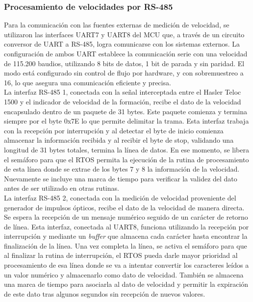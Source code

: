 \subsubsection{Procesamiento de velocidades por RS-485}

Para la comunicación con las fuentes externas de medición de velocidad, se utilizaron las interfaces UART7 y UART8 del MCU que, a través de un circuito conversor de UART a RS-485, logra comunicarse con los sistemas externos. La configuración de ambos UART establece la comunicación serie con una velocidad de 115.200 baudios, utilizando 8 bits de datos, 1 bit de parada y sin paridad. El modo está configurado sin control de flujo por hardware, y con sobremuestreo a 16, lo que asegura una comunicación eficiente y precisa. \\

La interfaz RS-485 1, conectada con la señal interceptada entre el Hasler Teloc 1500 y el indicador de velocidad de la formación, recibe el dato de la velocidad encapsulado dentro de un paquete de 31 bytes. Este paquete comienza y termina siempre por el byte 0x7E lo que permite delimitar la trama. Esta interfaz trabaja con la recepción por interrupción y al detectar el byte de inicio comienza almacenar la información recibida y al recibir el byte de stop, validando una longitud de 31 bytes totales, termina la línea de datos. En ese momento, se libera el semáforo para que el RTOS permita la ejecución de la rutina de procesamiento de esta línea donde se extrae de los bytes 7 y 8 la información de la velocidad. Nuevamente se incluye una marca de tiempo para verificar la validez del dato antes de ser utilizado en otras rutinas. \\

La interfaz RS-485 2, conectada con la medición de velocidad proveniente del generador de impulsos ópticos, recibe el dato de la velocidad de manera directa. Se espera la recepción de un mensaje numérico seguido de un carácter de retorno de línea. Esta interfaz, conectada al UART8, funciona utilizando la recepción por interrupción y mediante un \textit{buffer} que almacena cada carácter hasta encontrar la finalización de la línea. Una vez completa la línea, se activa el semáforo para que al finalizar la rutina de interrupción, el RTOS pueda darle mayor prioridad al procesamiento de esa línea donde se va a intentar convertir los caracteres leídos a un valor numérico y almacenarlo como dato de velocidad. También se almacena una marca de tiempo para asociarla al dato de velocidad y permitir la expiración de este dato tras algunos segundos sin recepción de nuevos valores. 